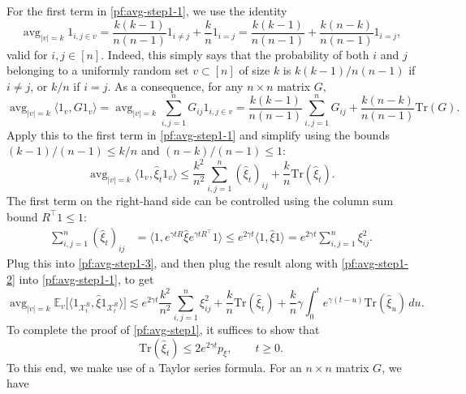 \documentclass[11pt,reqno]{amsart}
\numberwithin{equation}{section}
\theoremstyle{definition}
\def\E{{\mathbb E}}
\def\tr{{\mathrm{Tr}}}
\def\X{{\mathcal X}}
\DeclareMathOperator*{\avg}{avg}
\begin{document}
For the first term in \eqref{pf:avg-step1-1}, we use the identity 
\begin{equation}\label{pf:avg-step1-2.1}
\avg_{|v|=k} 1_{i,j \in v} = \frac{k(k-1)}{n(n-1)} 1_{i\neq j} + \frac{k}{n}1_{i=j} = \frac{k(k-1)}{n(n-1)} + \frac{k(n-k)}{n(n-1)}1_{i = j},
\end{equation}
valid for $i,j \in [n]$. Indeed, this simply says that the probability of both $i$ and $j$ belonging to a uniformly random set $v \subset [n]$ of size $k$ is $k(k-1)/n(n-1)$  if $i \neq j$, or $k/n$  if $i=j$. As a consequence, for any $n \times n$ matrix $G$,
\begin{equation}
\avg_{|v|=k} \langle 1_v, G1_v\rangle =\avg_{|v|=k} \sum_{i,j=1}^n G_{ij} 1_{i,j \in v}  =  \frac{k(k-1)}{n(n-1)}\sum_{i,j=1}^n G_{ij} + \frac{k(n-k)}{n(n-1)}\tr(G). \label{eq:avg-2way}
\end{equation}
Apply this to the first term in \eqref{pf:avg-step1-1} and simplify using the bounds $(k-1)/(n-1)\le k/n$ and $(n-k)/(n-1) \le 1$:
\begin{equation}
\avg_{|v|=k}  \langle 1_v,\widehat{\xi}_t 1_v\rangle \le \frac{k^2}{n^2}\sum_{i,j=1}^n (\widehat{\xi}_t)_{ij} + \frac{k }{n }\tr(\widehat{\xi}_t).\label{pf:avg-step1-3}
\end{equation}
The first term on the right-hand side can be controlled using the column sum bound $R^\top 1 \le 1$:
\begin{align*}
\sum_{i,j=1}^n (\widehat{\xi}_t)_{ij} &=\big\langle 1, e^{\gamma t R}\widehat{\xi}e^{\gamma t R^\top} 1\big\rangle \le e^{2\gamma t} \langle 1, \widehat{\xi}1\rangle =e^{2\gamma t} \sum_{i,j=1}^n  \xi_{ij}^2.
\end{align*}
Plug this into \eqref{pf:avg-step1-3}, and then plug the result along with \eqref{pf:avg-step1-2} into \eqref{pf:avg-step1-1}, to get
\begin{equation}
\avg_{|v|=k}\E_v\big[  \langle 1_{\X_t^{R}}, \widehat{\xi} 1_{\X_t^{R}}\rangle  \big] \lesssim  e^{2\gamma t} \frac{k^2}{n^2} \sum_{i,j=1}^n  \xi_{ij}^2 + \frac{k }{n }\tr(\widehat{\xi}_t) + \frac{k}{n} \gamma \int_0^t e^{\gamma(t-u)}\tr(\widehat{\xi}_u)\,du . \label{pf:avg-step1-4}
\end{equation}
To complete the proof of \eqref{pf:avg-step1}, it suffices to show that
\begin{equation}
\tr(\widehat{\xi}_t) \le 2e^{2\gamma t}p_\xi, \qquad t \ge 0. \label{pf:avg-trxihat<pxi}
\end{equation}
To this end, we make use of a Taylor series formula. For an $n \times n$ matrix $G$, we have
\end{document}
